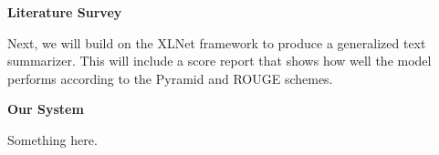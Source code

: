 \begin{large}
    \noindent\textbf{Literature Survey}
\end{large}

Next, we will build on the XLNet framework to produce a generalized text summarizer.
This will include a score report that shows how well the model performs according to the Pyramid and ROUGE schemes.

\vspace{5pt}

\begin{large}
    \noindent\textbf{Our System}
\end{large}

\vspace{5pt}

Something here.

\pagebreak
